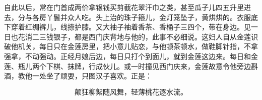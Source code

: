 自此以后，常在门首成两价拿银钱买剪截花翠汗巾之类，甚至瓜子儿四五升里进去，分与各房丫鬟并众人吃。头上治的珠子箍儿，金灯笼坠子，黄烘烘的。衣服底下穿着红绸裤儿，线捺护膝。又大袖子袖着香茶、香桶子三四个，带在身边。见一日也花消二三钱银子，都是西门庆背地与他的，此事不必细说。这妇人自从金莲识破他机关，每日只在金莲房里，把小意儿贴恋，与他顿茶顿水，做鞋脚针指，不拿强拿，不动强动。正经月娘后边，每日只打个到面儿，就到金莲这边来。每日和金莲、瓶儿两个下棋、抹牌，行成伙儿。或一时撞见西门庆来，金莲故意令他旁边斟酒，教他一处坐了顽耍，只图汉子喜欢。正是：

\[
颠狂柳絮随风舞，轻薄桃花逐水流。
\]
